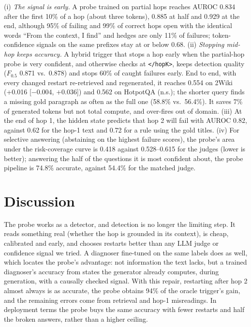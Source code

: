 \documentclass[11pt]{article}
\begin{document}
(i) \emph{The signal is early.} A probe trained on partial hops reaches AUROC 0.834 after the first 10\% of a hop (about three tokens), 0.885 at half and 0.929 at the end, although 95\% of failing and 99\% of correct hops open with the identical words ``From the context, I find'' and hedges are only 11\% of failures; token-confidence signals on the same prefixes stay at or below 0.68. (ii) \emph{Stopping mid-hop keeps accuracy.} A hybrid trigger that stops a hop early when the partial-hop probe is very confident, and otherwise checks at \texttt{</hopK>}, keeps detection quality ($F_{0.5}$ 0.871 vs.\ 0.878) and stops 60\% of caught failures early. End to end, with every changed restart re-retrieved and regenerated, it reaches 0.554 on 2Wiki (+0.016 [$-0.004$, $+0.036$]) and 0.562 on HotpotQA (n.s.); the shorter query finds a missing gold paragraph as often as the full one (58.8\% vs.\ 56.4\%). It saves 7\% of generated tokens but not total compute, and over-fires out of domain. (iii) At the end of hop 1, the hidden state predicts that hop 2 will fail with AUROC 0.82, against 0.62 for the hop-1 text and 0.72 for a rule using the gold titles. (iv) For selective answering (abstaining on the highest failure scores), the probe's area under the risk-coverage curve is 0.418 against 0.528--0.615 for the judges (lower is better); answering the half of the questions it is most confident about, the probe pipeline is 74.8\% accurate, against 54.4\% for the matched judge.

\section{Discussion}

The probe works as a detector, and detection is no longer the limiting step. It reads something real (whether the hop is grounded in its context), is cheap, calibrated and early, and chooses restarts better than any LLM judge or confidence signal we tried. A diagnoser fine-tuned on the same labels does as well, which locates the probe's advantage: not information the text lacks, but a trained diagnoser's accuracy from states the generator already computes, during generation, with a causally checked signal. With this repair, restarting after hop 2 almost always is as accurate, the probe obtains 94\% of the oracle trigger's gain, and the remaining errors come from retrieval and hop-1 misreadings. In deployment terms the probe buys the same accuracy with fewer restarts and half the broken answers, rather than a higher ceiling.
\end{document}
